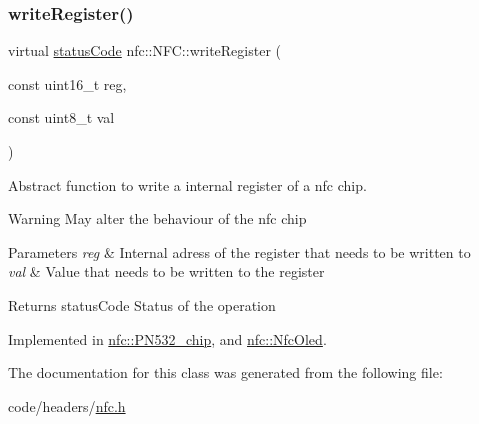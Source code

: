 \mbox{\label{classnfc_1_1NFC_a7e0a000aadae9b545e94ba213d4ac24e}} 
\subsubsection{\texorpdfstring{write\+Register()}{writeRegister()}}
{\footnotesize\ttfamily virtual \hyperlink{declarations_8h_ae1d20c5a38cae82ccaa6a77be3fd264b}{status\+Code} nfc\+::\+N\+F\+C\+::write\+Register (\begin{DoxyParamCaption}\item[{const uint16\+\_\+t}]{reg,  }\item[{const uint8\+\_\+t}]{val }\end{DoxyParamCaption})\hspace{0.3cm}{\ttfamily [pure virtual]}}



Abstract function to write a internal register of a nfc chip. 

\begin{DoxyWarning}{Warning}
May alter the behaviour of the nfc chip 
\end{DoxyWarning}

\begin{DoxyParams}{Parameters}
{\em reg} & Internal adress of the register that needs to be written to \\
\hline
{\em val} & Value that needs to be written to the register \\
\hline
\end{DoxyParams}
\begin{DoxyReturn}{Returns}
status\+Code Status of the operation 
\end{DoxyReturn}


Implemented in \hyperlink{classnfc_1_1PN532__chip_a2b82f8ed84c6a9b4a7f0c1ad699c13a7}{nfc\+::\+P\+N532\+\_\+chip}, and \hyperlink{classnfc_1_1NfcOled_a8782a26a35cb2b412621b580cc58eec4}{nfc\+::\+Nfc\+Oled}.



The documentation for this class was generated from the following file\+:\begin{DoxyCompactItemize}
\item 
code/headers/\hyperlink{nfc_8h}{nfc.\+h}\end{DoxyCompactItemize}
